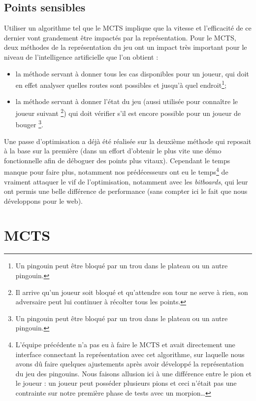 \documentclass[a4paper,11pt]{article}
\providecommand{\tightlist}{%
  \setlength{\itemsep}{0pt}\setlength{\parskip}{0pt}}
\begin{document}
\subsection{Points sensibles}\label{points-sensibles}

Utiliser un algorithme tel que le MCTS implique que la vitesse et
l'efficacité de ce dernier vont grandement être impactés par la
représentation. Pour le MCTS, deux méthodes de la représentation du jeu
ont un impact très important pour le niveau de l'intelligence
artificielle que l'on obtient :

\begin{itemize}
\tightlist
\item
  la méthode servant à donner tous les cas disponibles pour un joueur,
  qui doit en effet analyser quelles routes sont possibles et jusqu'à
  quel endroit\footnote{Un pingouin peut être bloqué par un trou dans le
    plateau ou un autre pingouin.};
\item
  la méthode servant à donner l'état du jeu (aussi utilisée pour
  connaître le joueur suivant \footnote{Il arrive qu'un joueur soit
    bloqué et qu'attendre son tour ne serve à rien, son adversaire peut
    lui continuer à récolter tous les points.}) qui doit vérifier s'il
  est encore possible pour un joueur de bouger \footnote{Un pingouin
    peut être bloqué par un trou dans le plateau ou un autre pingouin.}.
\end{itemize}

Une passe d'optimisation a déjà été réalisée sur la deuxième méthode qui
reposait à la base sur la première (dans un effort d'obtenir le plus
vite une démo fonctionnelle afin de déboguer des points plus vitaux).
Cependant le temps manque pour faire plus, notamment nos prédécesseurs
ont eu le temps\footnote{L'équipe précédente n'a pas eu à faire le MCTS
  et avait directement une interface connectant la représentation avec
  cet algorithme, sur laquelle nous avons dû faire quelques ajustements
  après avoir développé la représentation du jeu des pingouins. Nous
  faisons allusion ici à une différence entre le pion et le joueur : un
  joueur peut posséder plusieurs pions et ceci n'était pas une
  contrainte sur notre première phase de tests avec un morpion\ldots{}}
de vraiment attaquer le vif de l'optimisation, notamment avec les
\emph{bitboards}, qui leur ont permis une belle différence de
performance (sans compter ici le fait que nous développons pour le web).

\section{MCTS}\label{mcts}
\end{document}
